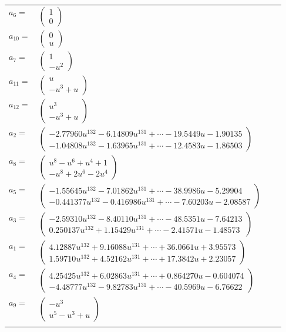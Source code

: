 \documentclass[1p]{elsarticle_modified}
\theoremstyle{definition}
\begin{document}
\begin{tabular}{m{7pt} m{180pt} m{7pt} m{180pt} }
\flushright $a_{6}=$&$\begin{pmatrix}1\\0\end{pmatrix}$ \\
\flushright $a_{10}=$&$\begin{pmatrix}0\\u\end{pmatrix}$ \\
\flushright $a_{7}=$&$\begin{pmatrix}1\\- u^2\end{pmatrix}$ \\
\flushright $a_{11}=$&$\begin{pmatrix}u\\- u^3+u\end{pmatrix}$ \\
\flushright $a_{12}=$&$\begin{pmatrix}u^3\\- u^3+u\end{pmatrix}$ \\
\flushright $a_{2}=$&$\begin{pmatrix}-2.77960 u^{132}-6.14809 u^{131}+\cdots-19.5449 u-1.90135\\-1.04808 u^{132}-1.63965 u^{131}+\cdots-12.4583 u-1.86503\end{pmatrix}$ \\
\flushright $a_{8}=$&$\begin{pmatrix}u^8- u^6+u^4+1\\- u^8+2 u^6-2 u^4\end{pmatrix}$ \\
\flushright $a_{5}=$&$\begin{pmatrix}-1.55645 u^{132}-7.01862 u^{131}+\cdots-38.9986 u-5.29904\\-0.441377 u^{132}-0.416986 u^{131}+\cdots-7.60203 u-2.08587\end{pmatrix}$ \\
\flushright $a_{3}=$&$\begin{pmatrix}-2.59310 u^{132}-8.40110 u^{131}+\cdots-48.5351 u-7.64213\\0.250137 u^{132}+1.15429 u^{131}+\cdots-2.41571 u-1.48573\end{pmatrix}$ \\
\flushright $a_{1}=$&$\begin{pmatrix}4.12887 u^{132}+9.16088 u^{131}+\cdots+36.0661 u+3.95573\\1.59710 u^{132}+4.52162 u^{131}+\cdots+17.3842 u+2.23057\end{pmatrix}$ \\
\flushright $a_{4}=$&$\begin{pmatrix}4.25425 u^{132}+6.02863 u^{131}+\cdots+0.864270 u-0.604074\\-4.48777 u^{132}-9.82783 u^{131}+\cdots-40.5969 u-6.76622\end{pmatrix}$ \\
\flushright $a_{9}=$&$\begin{pmatrix}- u^3\\u^5- u^3+u\end{pmatrix}$\\&\end{tabular}
\end{document}
